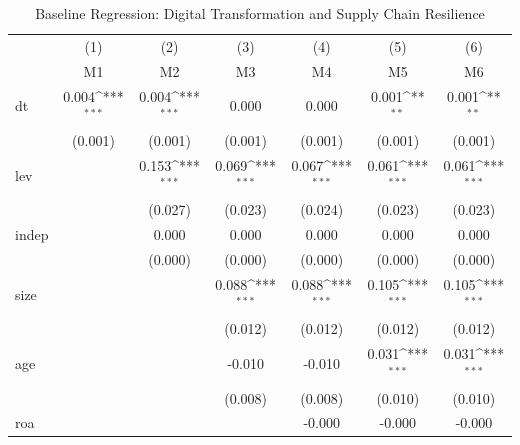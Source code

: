 \begin{table}[ht!]\centering\footnotesize
\def\sym#1{\ifmmode^{#1}\else\(^{#1}\)\fi}
\caption{Baseline Regression: Digital Transformation and Supply Chain Resilience}
\begin{tabular}{l*{6}{c}}
\hline\hline
            &\multicolumn{1}{c}{(1)}&\multicolumn{1}{c}{(2)}&\multicolumn{1}{c}{(3)}&\multicolumn{1}{c}{(4)}&\multicolumn{1}{c}{(5)}&\multicolumn{1}{c}{(6)}\\
            &\multicolumn{1}{c}{M1}&\multicolumn{1}{c}{M2}&\multicolumn{1}{c}{M3}&\multicolumn{1}{c}{M4}&\multicolumn{1}{c}{M5}&\multicolumn{1}{c}{M6}\\
\hline
dt          &       0.004\sym{***}&       0.004\sym{***}&       0.000         &       0.000         &       0.001\sym{**} &       0.001\sym{**} \\
            &     (0.001)         &     (0.001)         &     (0.001)         &     (0.001)         &     (0.001)         &     (0.001)         \\
lev         &                     &       0.153\sym{***}&       0.069\sym{***}&       0.067\sym{***}&       0.061\sym{***}&       0.061\sym{***}\\
            &                     &     (0.027)         &     (0.023)         &     (0.024)         &     (0.023)         &     (0.023)         \\
indep       &                     &       0.000         &       0.000         &       0.000         &       0.000         &       0.000         \\
            &                     &     (0.000)         &     (0.000)         &     (0.000)         &     (0.000)         &     (0.000)         \\
size        &                     &                     &       0.088\sym{***}&       0.088\sym{***}&       0.105\sym{***}&       0.105\sym{***}\\
            &                     &                     &     (0.012)         &     (0.012)         &     (0.012)         &     (0.012)         \\
age         &                     &                     &      -0.010         &      -0.010         &       0.031\sym{***}&       0.031\sym{***}\\
            &                     &                     &     (0.008)         &     (0.008)         &     (0.010)         &     (0.010)         \\
roa         &                     &                     &                     &      -0.000         &      -0.000         &      -0.000         \\

\end{tabular}
\end{table}
